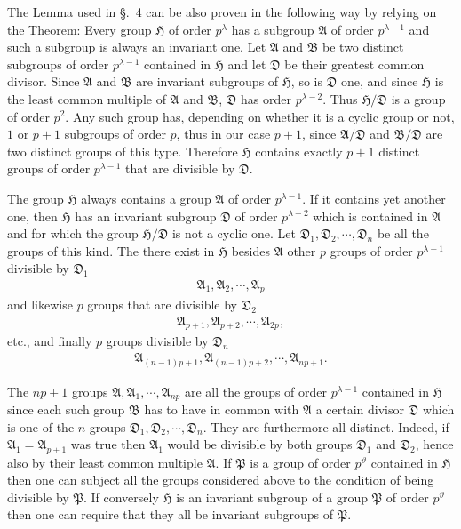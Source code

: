 \documentclass[a5paper,12pt]{article}
\let\fr\mathfrak
\newcommand{\CA}{\fr{A}}
\newcommand{\CB}{\fr{B}}
\newcommand{\CD}{\fr{D}}
\newcommand{\CH}{\fr{H}}
\newcommand{\CP}{\fr{P}}
\newcommand{\?}{{\color{blue}${}^{(?)}$}}
\newcounter{origpagecounter}{}
\newcommand{\origpagebreak}{\mark{\arabic{origpagecounter}}\addtocounter{origpagecounter}{1}\mark{\arabic{origpagecounter}}}
\begin{document}
The Lemma used in \S.~4
can be also proven 
in the following way
by relying on the Theorem:
%
%
Every group $\CH$ of order $p^\lambda$
has a subgroup $\CA$ of order $p^{\lambda-1}$
and such a subgroup
is always an invariant one.
%
%
Let $\CA$ and $\CB$ be 
two distinct subgroups of order $p^{\lambda-1}$
contained in $\CH$
and
let $\CD$ be their greatest common divisor.
%
%
Since $\CA$ and $\CB$ are invariant subgroups of $\CH$,
so is $\CD$ one,
and
since $\CH$ is the least common multiple of $\CA$ and $\CB$,
$\CD$ has order $p^{\lambda-2}$.
%
%
Thus
$\CH / \CD$ is a group of order $p^2$.
%
%
Any such group has,
depending on whether
it is a cyclic group or not,
$1$ or $p+1$ 
subgroups of order $p$,
thus in our case 
$p + 1$,
since $\CA / \CD$ and $\CB / \CD$
are two distinct groups of this type.
%
%
Therefore
$\CH$ contains exactly $p + 1$
distinct groups of order $p^{\lambda-1}$
that are divisible by $\CD$.


\origpagebreak


The group $\CH$ always contains
a group $\CA$ of order $p^{\lambda-1}$.
%
%
If it contains yet another one,
then
$\CH$ has an invariant subgroup $\CD$ of order $p^{\lambda-2}$
which is contained in $\CA$
and
for which the group $\CH / \CD$ is not a cyclic one.
%
%
Let $\CD_1, \CD_2, \cdots, \CD_n$
be 
all the groups of this kind.
%
%
The there exist in $\CH$ besides $\CA$
other $p$ groups of order $p^{\lambda-1}$
divisible by $\CD_1$
\begin{align} \label{e:5-1} \tag{1.}
	\CA_1, \CA_2, \cdots, \CA_p
\end{align}
and likewise
$p$ groups that are
divisible by $\CD_2$
\begin{align} \label{e:5-2} \tag{2.}
	\CA_{p+1}, \CA_{p+2}, \cdots, \CA_{2 p}
	,
\end{align}
etc.,
and finally
$p$ groups 
divisible by $\CD_n$
\begin{align} \label{e:5-3} \tag{3.}
	\CA_{(n-1) p + 1},
	\CA_{(n-1) p + 2},
	\cdots,
	\CA_{n p + 1}
	.
\end{align}


The $n p + 1$ groups
$\CA, \CA_1, \cdots, \CA_{n p}$
are all the groups of order $p^{\lambda-1}$ contained in $\CH$ 
since
each such group $\CB$ 
has to have 
in common with $\CA$
a certain divisor $\CD$
which is one of the $n$ groups $\CD_1, \CD_2, \cdots, \CD_n$.
%
%
They are furthermore all distinct.
%
%
Indeed,
if $\CA_1 = \CA_{p+1}$ was true
then
$\CA_1$ would be divisible by both groups $\CD_1$ and $\CD_2$,
hence also by their least common multiple $\CA$.
%
%
If $\CP$ is a group of order $p^\vartheta$
contained in $\CH$
then
one can subject all the groups considered above
to the condition
of being divisible by $\CP$.
%
%
If conversely
$\CH$ is an invariant subgroup of a group $\CP$ of order $p^\vartheta$
then
one can require
that
they all be invariant subgroups of $\CP$.
\end{document}
